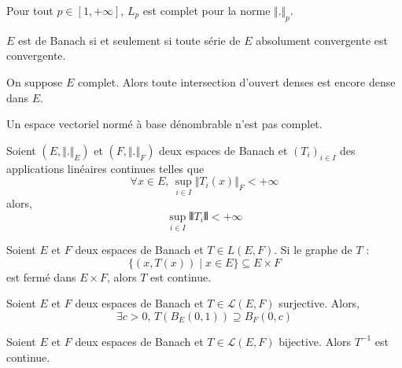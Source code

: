 	\begin{theorem}
  	Pour tout $p \in [1, +\infty]$, $L_p$ est complet pour la norme $\Vert . \Vert_p$.
  \end{theorem}


	\begin{proposition}
		$E$ est de Banach si et seulement si toute série de $E$ absolument convergente est convergente.
	\end{proposition}


	\begin{theorem}[Baire]
		On suppose $E$ complet. Alors toute intersection d'ouvert denses est encore dense dans $E$.
	\end{theorem}


	\begin{application}
		Un espace vectoriel normé à base dénombrable n'est pas complet.
	\end{application}


	\begin{application}
		Soient $(E, \Vert . \Vert_E)$ et $(F, \Vert . \Vert_F)$ deux espaces de Banach et $(T_i)_{i \in I}$ des applications linéaires continues telles que
		\[ \forall x \in E, \, \sup_{i \in I} \Vert T_i(x) \Vert_F < +\infty \]
		alors,
		\[ \sup_{i \in I} \VERT T_i \VERT < +\infty \]
	\end{application}

	\begin{application}
		Soient $E$ et $F$ deux espaces de Banach et $T \in L(E,F)$. Si le graphe de $T$ :
		\[ \{ (x, T(x)) \mid x \in E \} \subseteq E \times F \]
		est fermé dans $E \times F$, alors $T$ est continue.
	\end{application}

		\begin{application}
		Soient $E$ et $F$ deux espaces de Banach et $T \in \mathcal{L}(E,F)$ surjective. Alors,
		\[ \exists c > 0, \, T\left(B_E(0,1)\right) \supseteq B_F(0,c) \]
	\end{application}

	\begin{corollary}
		Soient $E$ et $F$ deux espaces de Banach et $T \in \mathcal{L}(E,F)$ bijective. Alors $T^{-1}$ est continue.
	\end{corollary}

